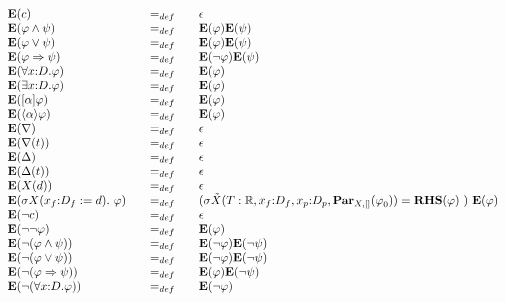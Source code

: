 \documentclass{article}
\begin{document}
\begin{equation*}
\begin{array}{lll}
{\mathbf{E}}(c) & =_{def} & \epsilon \\
{\mathbf{E}}(\varphi \wedge \psi ) & =_{def} & {\mathbf{E}}(\varphi ){%
\mathbf{E}}(\psi ) \\
{\mathbf{E}}(\varphi \vee \psi ) & =_{def} & {\mathbf{E}}(\varphi ){\mathbf{E%
}}(\psi ) \\
{\mathbf{E}}(\varphi \Rightarrow \psi ) & =_{def} & {\mathbf{E}}(\lnot
\varphi ){\mathbf{E}}(\psi ) \\
{\mathbf{E}}(\forall {x{:}D}.\varphi ) & =_{def} & {\mathbf{E}}(\varphi ) \\
{\mathbf{E}}(\exists {x{:}D}.\varphi ) & =_{def} & {\mathbf{E}}(\varphi ) \\
{\mathbf{E}}([\alpha ]\varphi ) & =_{def} & {\mathbf{E}}(\varphi ) \\
{\mathbf{E}}(\langle \alpha \rangle \varphi ) & =_{def} & {\mathbf{E}}%
(\varphi ) \\
{\mathbf{E}}(\nabla ) & =_{def} & \epsilon \\
{\mathbf{E}}(\nabla (t)) & =_{def} & \epsilon \\
{\mathbf{E}}(\Delta ) & =_{def} & \epsilon \\
{\mathbf{E}}(\Delta (t)) & =_{def} & \epsilon \\
{\mathbf{E}}(X(d)) & =_{def} & \epsilon \\
{\mathbf{E}}(\sigma X(x_{f}{:}D_{f}:=d).~\varphi )~~~ & =_{def}~~~ & (\sigma
\tilde{X}(T:\mathbb{R},x_{f}{:}D_{f},x_{p}{:}D_{p},\mathbf{Par}%
_{X,[]}(\varphi _{0}))={\mathbf{RHS}}(\varphi )~)~{\mathbf{E}}(\varphi ) \\
{\mathbf{E}}(\lnot c) & =_{def} & \epsilon \\
{\mathbf{E}}(\lnot \lnot \varphi ) & =_{def} & {\mathbf{E}}(\varphi ) \\
{\mathbf{E}}(\lnot (\varphi \wedge \psi )) & =_{def} & {\mathbf{E}}(\lnot
\varphi ){\mathbf{E}}(\lnot \psi ) \\
{\mathbf{E}}(\lnot (\varphi \vee \psi )) & =_{def} & {\mathbf{E}}(\lnot
\varphi ){\mathbf{E}}(\lnot \psi ) \\
{\mathbf{E}}(\lnot (\varphi \Rightarrow \psi )) & =_{def} & {\mathbf{E}}%
(\varphi ){\mathbf{E}}(\lnot \psi ) \\
{\mathbf{E}}(\lnot (\forall {x{:}D}.\varphi )) & =_{def} & {\mathbf{E}}%
(\lnot \varphi ) \\

\end{array}
\end{equation*}
\end{document}

